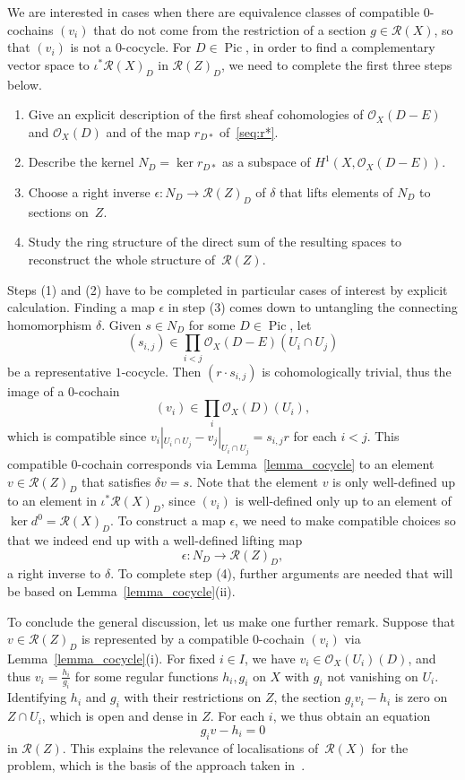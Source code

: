 \documentclass[a4paper,11pt]{amsart}
\theoremstyle{plain}
\theoremstyle{definition}
\newcommand{\R}{\mathcal{R}}
\newcommand{\Ox}{\mathcal{O}}
\DeclareMathOperator{\Pic}{Pic}
\newcommand{\pic}{\Pic}
\begin{document}
We are interested in cases when there are equivalence classes of compatible $0$-cochains $(v_i)$ that do not come from the restriction of a section $g\in \R(X)$, so that $(v_i)$ is not a $0$-cocycle.
For $D\in\Pic$, in order to find a complementary vector space to $\iota^*\R(X)_D$ in $\R(Z)_D$, we need to complete the first three steps below.
\begin{enumerate}
    \item Give an explicit description of the first sheaf cohomologies of $\Ox_X(D-E)$ and $\Ox_X(D)$ and of the map $r_{D*}$ of~\eqref{seq:r*}. 
    \item Describe the kernel $N_D=\ker r_{D*}$ as a subspace of $H^1(X, \Ox_X(D-E))$.
    \item Choose a right inverse $\epsilon\colon N_D\to \R(Z)_D$ of $\delta$ that lifts elements of $N_D$ to sections on~$Z$.
    \item Study the ring structure of the direct sum of the resulting spaces to reconstruct the whole structure of~$\R(Z)$. 
\end{enumerate}
Steps (1) and (2) have to be completed in particular cases of interest by explicit calculation. Finding a map $\epsilon$ in step (3) comes down to untangling the connecting homomorphism $\delta$. Given $s \in N_D$ for some $D \in \pic$, let 
\[(s_{i,j})\in \prod_{i<j}\Ox_X(D-E)(U_i \cap U_j)\] be a representative $1$-cocycle. Then $(r \cdot s_{i,j})$ is cohomologically trivial, thus the image of a $0$-cochain \[(v_i) \in \prod_{i}\Ox_X(D)(U_i),\] which is compatible since $v_i|_{U_i \cap U_j} - v_j|_{U_i \cap U_j} = s_{i,j}r$ for each $i < j$. This compatible $0$-cochain corresponds via Lemma~\ref{lemma_cocycle} to an element $v \in \R(Z)_D$ that satisfies $\delta v = s$. Note that the element $v$ is only well-defined up to an element in $\iota^* \R(X)_D$, since $(v_i)$ is well-defined only up to an element of $\ker d^0 = \R(X)_D$. To construct a map $\epsilon$, we need to make compatible choices so that we indeed end up with a well-defined lifting map
\[
\epsilon \colon  N_D  \to  \R(Z)_D,
\]
a right inverse to $\delta$. To complete step (4), further arguments are needed that will be based on Lemma~\ref{lemma_cocycle}(ii). 

To conclude the general discussion, let us make one further remark. Suppose that $v \in \R(Z)_D$ is represented by a compatible $0$-cochain $(v_i)$ via Lemma~\ref{lemma_cocycle}(i). For fixed $i \in I$, we have $v_i \in \Ox_{X}(U_i)(D)$, and thus $v_i = \frac{h_i}{g_i}$ for some regular functions $h_i,g_i$ on $X$ with $g_i$ not vanishing on $U_i$. Identifying $h_i$ and $g_i$ with their restrictions on $Z$, the section $g_i v_i - h_i$ is zero on $Z \cap U_i$, which is open and dense in $Z$. For each $i$, we thus obtain an equation
\[g_i v - h_i = 0\]
in $\R(Z)$. This explains the relevance of localisations of~$\R(X)$ for the problem, which is the basis of the approach taken in~\cite{lafaceetal}. 
\end{document}

